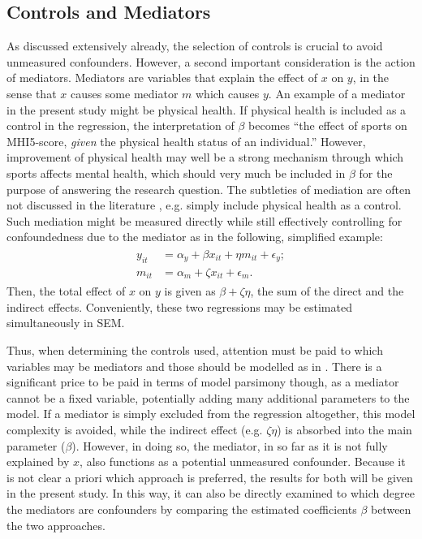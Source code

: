 \subsection{Controls and Mediators}
\label{sec:methods:controls_mediators}
As discussed extensively already, the selection of controls is crucial to avoid unmeasured confounders. However,
a second important consideration is the action of mediators. Mediators are variables that explain the effect
of $x$ on $y$, in the sense that $x$ causes some mediator $m$ which causes $y$. An example of a mediator in the present
study might be physical health. If physical health is included as a control in the regression, the interpretation of $\beta$
becomes ``the effect of sports on MHI5-score, \textit{given} the physical health status of an individual.'' However,
improvement of physical health may well be a strong mechanism through which sports affects mental health, which
should very much be included in $\beta$ for the purpose of answering the research question. The subtleties of mediation
are often not discussed in the literature \cite{imbens2024causal}, e.g.  simply include physical health as a control.
Such mediation might be measured directly while still effectively controlling for confoundedness due to the mediator as
in the following, simplified example:
\begin{align}
\begin{split}
    \label{eq:methods:mediation_example}
    y_{it} &= \alpha_y + \beta x_{it} + \eta m_{it} + \epsilon_y; \\
    m_{it} &= \alpha_m + \zeta x_{it} + \epsilon_m.
\end{split}
\end{align}
Then, the total effect of $x$ on $y$ is given as $\beta + \zeta \eta$, the sum of the direct and the indirect effects.
Conveniently, these two regressions may be estimated simultaneously in SEM.

Thus, when determining the controls used, attention must be paid to which variables may be mediators and those should be
modelled as in . There is a significant price to be paid in terms of model parsimony
though, as a mediator cannot be a fixed variable, potentially adding many additional parameters to the model.
If a mediator is simply excluded from the regression altogether, this model complexity is avoided, while the indirect
effect (e.g. $\zeta \eta$) is absorbed into the main parameter ($\beta$). However, in doing so, the mediator, in so far
as it is not fully explained by $x$, also functions as a potential unmeasured confounder.
Because it is not clear a priori which approach is preferred, the results for both will be given in the present study.
In this way, it can also be directly examined to which degree the mediators are confounders by comparing
the estimated coefficients $\beta$ between the two approaches.

